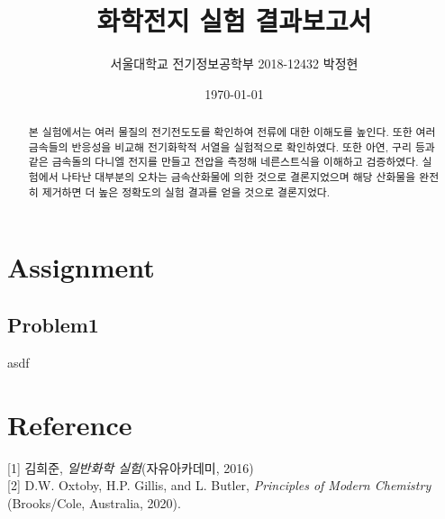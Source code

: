 \documentclass[%
 reprint,
 amsmath,amssymb,
 aps,
]{revtex4-2}
\begin{document}
\title{화학전지 실험 결과보고서}

\author{서울대학교 전기정보공학부 2018-12432 박정현}
\date{\today}%

\begin{abstract}
본 실험에서는 여러 물질의 전기전도도를 확인하여 전류에 대한 이해도를 높인다. 또한 여러 금속들의 반응성을 비교해 전기화학적 서열을 실험적으로 확인하였다. 또한 아연, 구리 등과 같은 금속돌의 다니엘 전지를 만들고 전압을  측정해 네른스트식을 이해하고 검증하였다. 실험에서 나타난 대부분의 오차는 금속산화물에 의한 것으로 결론지었으며 해당 산화물을 완전히 제거하면 더 높은 정확도의 실험 결과를 얻을 것으로 결론지었다.
\end{abstract}

\maketitle


\section{\label{sec:level1}Assignment}
\subsection{\label{sec:level2}Problem1}
asdf

\section{\label{sec:level1}Reference}
[1] 김희준, \textit{일반화학 실험}(자유아카데미, 2016)\\

[2] D.W. Oxtoby, H.P. Gillis, and L. Butler, \textit{Principles of Modern Chemistry} (Brooks/Cole, Australia, 2020).
\end{document}
